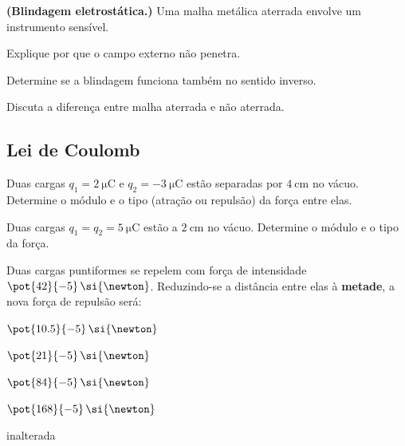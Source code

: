 \begin{questao}[4]{}

\textbf{(Blindagem eletrostática.)} Uma malha metálica aterrada envolve um
instrumento sensível.
\begin{itensq}
\item Explique por que o campo externo não penetra.
\item Determine se a blindagem funciona também no sentido inverso.
\item Discuta a diferença entre malha aterrada e não aterrada.
\end{itensq}


\end{questao}


\subsection{Lei de Coulomb}

\blocofixacao
\begin{questao}[1]{}

Duas cargas $q_1 = \SI{+2}{\micro\coulomb}$ e $q_2 = \SI{-3}{\micro\coulomb}$
estão separadas por $\SI{4}{\centi\meter}$ no vácuo. Determine o módulo e o tipo
(atração ou repulsão) da força entre elas.


\end{questao}
\begin{questao}[1]{}

Duas cargas $q_1 = q_2 = \SI{+5}{\micro\coulomb}$ estão a
$\SI{2}{\centi\meter}$ no vácuo. Determine o módulo e o tipo da força.


\end{questao}
\begin{questao}[1]{}

Duas cargas puntiformes se repelem com força de intensidade
$\pot{42}{-5}\,\si{\newton}$. Reduzindo-se a distância entre elas à
\textbf{metade}, a nova força de repulsão será:
\begin{alternativas}[2]
\item $\pot{10.5}{-5}\,\si{\newton}$
\item $\pot{21}{-5}\,\si{\newton}$
\item $\pot{84}{-5}\,\si{\newton}$
\item $\pot{168}{-5}\,\si{\newton}$
\item inalterada
\end{alternativas}


\end{questao}

